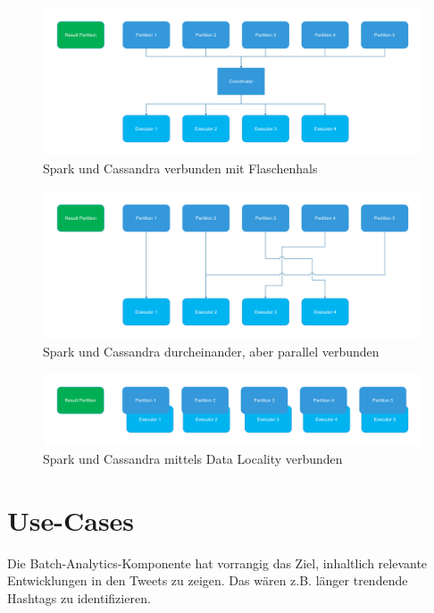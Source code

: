 \begin{figure}
\centering
\includegraphics[width=\textwidth]{bilder/eigene20PrC3A4sentation-img1.png}
\caption{Spark und Cassandra verbunden mit Flaschenhals}
\end{figure}


\begin{figure}
\centering
\includegraphics[width=\textwidth]{bilder/eigene20PrC3A4sentation-img2.png}
\caption{Spark und Cassandra durcheinander, aber parallel verbunden}
\end{figure}


\begin{figure}
\centering
\includegraphics[width=\textwidth]{bilder/eigene20PrC3A4sentation-img3.png}
\caption{Spark und Cassandra mittels Data Locality verbunden}
\end{figure}


\section{Use-Cases}
Die Batch-Analytics-Komponente hat vorrangig das Ziel, inhaltlich
relevante Entwicklungen in den Tweets zu zeigen. Das wären z.B. länger
trendende Hashtags zu identifizieren.

